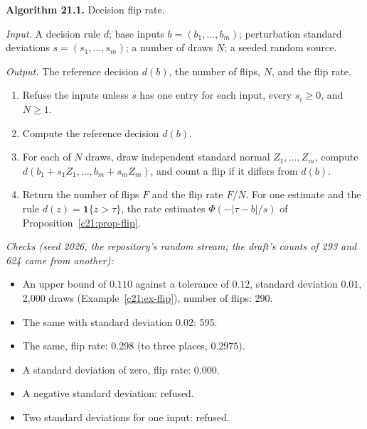 \begin{mdframed}[linecolor=gray!60,backgroundcolor=gray!5]
\textbf{Algorithm 21.1.} Decision flip rate.\par\smallskip
\textit{Input.} A decision rule $d$; base inputs $b=(b_1,\dots,b_m)$; perturbation standard deviations
$s=(s_1,\dots,s_m)$; a number of draws $N$; a seeded random source.\par
\textit{Output.} The reference decision $d(b)$, the number of flips, $N$, and the flip rate.
\begin{enumerate}
\item Refuse the inputs unless $s$ has one entry for each input, every $s_i\ge0$, and $N\ge1$.
\item Compute the reference decision $d(b)$.
\item For each of $N$ draws, draw independent standard normal $Z_1,\dots,Z_m$, compute $d(b_1+s_1Z_1,\dots,b_m+s_mZ_m)$, and count a flip if it differs from $d(b)$.
\item Return the number of flips $F$ and the flip rate $F/N$. For one estimate and the rule $d(z)=\mathbf 1\{z>\tau\}$, the rate estimates $\Phi(-|\tau-b|/s)$ of Proposition~\ref{c21:prop-flip}.
\end{enumerate}
\textit{Checks (seed 2026, the repository's random stream; the draft's counts of 293 and 624 came from another):}
\begin{itemize}
\item An upper bound of $0.110$ against a tolerance of $0.12$, standard deviation $0.01$, 2,000 draws (Example~\ref{c21:ex-flip}), number of flips: 290.
\item The same with standard deviation $0.02$: 595.
\item The same, flip rate: 0.298 (to three places, $0.2975$).
\item A standard deviation of zero, flip rate: 0.000.
\item A negative standard deviation: refused.
\item Two standard deviations for one input: refused.
\end{itemize}


\end{mdframed}
